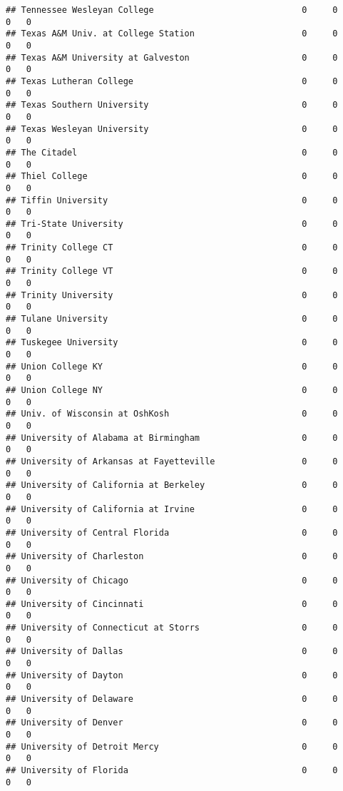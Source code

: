 \documentclass[
]{article}
\begin{document}
\begin{verbatim}
## Tennessee Wesleyan College                             0     0        0   0
## Texas A&M Univ. at College Station                     0     0        0   0
## Texas A&M University at Galveston                      0     0        0   0
## Texas Lutheran College                                 0     0        0   0
## Texas Southern University                              0     0        0   0
## Texas Wesleyan University                              0     0        0   0
## The Citadel                                            0     0        0   0
## Thiel College                                          0     0        0   0
## Tiffin University                                      0     0        0   0
## Tri-State University                                   0     0        0   0
## Trinity College CT                                     0     0        0   0
## Trinity College VT                                     0     0        0   0
## Trinity University                                     0     0        0   0
## Tulane University                                      0     0        0   0
## Tuskegee University                                    0     0        0   0
## Union College KY                                       0     0        0   0
## Union College NY                                       0     0        0   0
## Univ. of Wisconsin at OshKosh                          0     0        0   0
## University of Alabama at Birmingham                    0     0        0   0
## University of Arkansas at Fayetteville                 0     0        0   0
## University of California at Berkeley                   0     0        0   0
## University of California at Irvine                     0     0        0   0
## University of Central Florida                          0     0        0   0
## University of Charleston                               0     0        0   0
## University of Chicago                                  0     0        0   0
## University of Cincinnati                               0     0        0   0
## University of Connecticut at Storrs                    0     0        0   0
## University of Dallas                                   0     0        0   0
## University of Dayton                                   0     0        0   0
## University of Delaware                                 0     0        0   0
## University of Denver                                   0     0        0   0
## University of Detroit Mercy                            0     0        0   0
## University of Florida                                  0     0        0   0

\end{verbatim}
\end{document}
